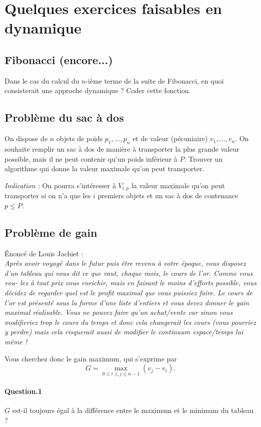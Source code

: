 \documentclass[10pt,a4paper]{article}
\begin{document}
\section{Quelques exercices faisables en dynamique}

\subsection{Fibonacci (encore...)}
Dans le cas du calcul du $n$-ième terme de la suite de Fibonacci, en quoi 
consisterait une approche dynamique ? Coder
cette fonction.

\subsection{Problème du sac à dos}
On dispose de $n$ objets de poids $p_1,...,p_n$ et de valeur (pécuniaire) 
$v_1,...,v_n$. On souhaite remplir un sac à dos de manière à transporter la plus
grande valeur possible, mais il ne peut contenir qu'un poids inférieur à $P$.
Trouver un algorithme qui donne la valeur maximale qu'on peut transporter.

\textit{Indication :} On pourra s'intéresser à $V_{i,p}$ la valeur maximale
qu'on peut transporter si on n'a que les $i$ premiers objets et un sac à dos de
contenance $p \leq P$.

\subsection{Problème de gain}
Énoncé de Louis Jachiet : \\
\textit{Après avoir voyagé dans le futur puis être revenu à votre
époque, vous disposez d’un tableau qui vous dit ce que
vaut, chaque mois, le cours de l’or. Comme vous vou-
lez à tout prix vous enrichir, mais en faisant le moins
d’efforts possible, vous décidez de regarder quel est le
profit maximal que vous puissiez faire. Le cours de l’or
est présenté sous la forme d’une liste d’entiers et vous
devez donner le gain maximal réalisable. Vous ne pouvez
faire qu’un achat/vente car sinon vous modifieriez trop
le cours du temps et donc cela changerait les cours (vous
pourriez y perdre) mais cela risquerait aussi de modifier
le continuum espace/temps lui même !}

Vous cherchez donc le gain maximum, qui s'exprime par
\[G = \max_{0\leq i \leq j \leq n-1} (v_j - v_i). \]
\paragraph{Question.1} $G$ est-il toujours égal à la différence entre le maximum et le minimum du tableau ?
\end{document}

